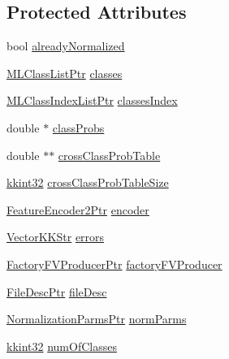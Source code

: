 \subsection*{Protected Attributes}
\begin{DoxyCompactItemize}
\item 
bool \hyperlink{class_k_k_m_l_l_1_1_model_a56de637fe285bd31edb55f0eaca5fbb7}{already\+Normalized}
\item 
\hyperlink{namespace_k_k_m_l_l_af091cde3f4a4315658b41a5e7583fc26}{M\+L\+Class\+List\+Ptr} \hyperlink{class_k_k_m_l_l_1_1_model_a764e7680f07814c3c5313dc4e4de60a1}{classes}
\item 
\hyperlink{namespace_k_k_m_l_l_abf6e92f3564941506e939a17bcadfbde}{M\+L\+Class\+Index\+List\+Ptr} \hyperlink{class_k_k_m_l_l_1_1_model_adbb9475e16bb2c3eef52170485e3018e}{classes\+Index}
\item 
double $\ast$ \hyperlink{class_k_k_m_l_l_1_1_model_a9d51bc464ab7049659aeea120bf9db26}{class\+Probs}
\item 
double $\ast$$\ast$ \hyperlink{class_k_k_m_l_l_1_1_model_aa209a1fe3b39f80df9adc87e2f0343d5}{cross\+Class\+Prob\+Table}
\item 
\hyperlink{namespace_k_k_b_a8fa4952cc84fda1de4bec1fbdd8d5b1b}{kkint32} \hyperlink{class_k_k_m_l_l_1_1_model_a6e6436028d45da095f732b4bf7835101}{cross\+Class\+Prob\+Table\+Size}
\item 
\hyperlink{namespace_k_k_m_l_l_a1f6189100c36e1d399f2155020fcfc8a}{Feature\+Encoder2\+Ptr} \hyperlink{class_k_k_m_l_l_1_1_model_afd3a7d6f769fd7d818ed4f8a8d6479b3}{encoder}
\item 
\hyperlink{class_k_k_b_1_1_vector_k_k_str}{Vector\+K\+K\+Str} \hyperlink{class_k_k_m_l_l_1_1_model_accef16f148db89f22ae5d0ee19828877}{errors}
\item 
\hyperlink{namespace_k_k_m_l_l_a82812d1feb85a6cff72d059bc67bb90e}{Factory\+F\+V\+Producer\+Ptr} \hyperlink{class_k_k_m_l_l_1_1_model_a8a523b3f8a31f04da39e2e673bc6bbcb}{factory\+F\+V\+Producer}
\item 
\hyperlink{namespace_k_k_m_l_l_aa0d0b6ab4ec18868a399b8455b05d914}{File\+Desc\+Ptr} \hyperlink{class_k_k_m_l_l_1_1_model_a65c48cd3601efe64e1431beba55e24f4}{file\+Desc}
\item 
\hyperlink{namespace_k_k_m_l_l_a398d05517609c333aaf415007f713d79}{Normalization\+Parms\+Ptr} \hyperlink{class_k_k_m_l_l_1_1_model_a48d8d3c4865176a24cee0b2b733da058}{norm\+Parms}
\item 
\hyperlink{namespace_k_k_b_a8fa4952cc84fda1de4bec1fbdd8d5b1b}{kkint32} \hyperlink{class_k_k_m_l_l_1_1_model_ad41340e916a5ccdae7ed38d9546a8445}{num\+Of\+Classes}
$$
\end{DoxyCompactItemize}
